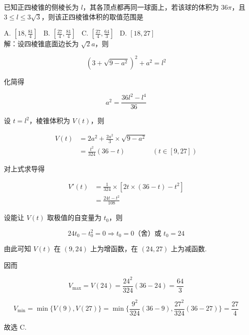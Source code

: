 \documentclass[UTF8]{ctexart}
\begin{document}
\thispagestyle{empty}
\pagestyle{empty}

\noindent 已知正四棱锥的侧棱长为 $l$，其各顶点都再同一球面上，若该球的体积为 $36 \pi$，且 $3 \le l \le 3 \sqrt 3$，则该正四棱锥体积的取值范围是

\noindent A. $[18,\frac{81}{4}]$ \,
B. $[\frac{27}{4},\frac{81}{4}]$ \,
C. $[\frac{27}{4},\frac{64}{3}]$ \,
D. $[18,27]$ \\

\noindent 解：设四棱锥底面边长为 $\sqrt 2a$，则

$$(3+\sqrt{9-a^2})^2+a^2=l^2$$

\noindent 化简得

$$a^2=\frac{36l^2-l^4}{36}$$

\noindent 设 $t=l^2$，棱锥体积为 $V(t)$，则

\begin{align*}
V(t) &= 2a^2+\frac{2a^2}{3} \times \sqrt{9-a^2} \\
&= \frac{t^2}{324}(36-t) \qquad  \qquad (t \in [9,27])
\end{align*}

\noindent 对上式求导得

\begin{align*}
V'(t) &= \frac{1}{324} \times [2t \times (36-t)-t^2] \\ 
&= \frac{24t-t^2}{108}
\end{align*}

\noindent 设能让 $V(t)$ 取极值的自变量为 $t_0$，则

$$24t_0-t_0^2=0 \Rightarrow t_0=0 \text{（舍）或 } t_0=24$$

\noindent 由此可知 $V(t)$ 在 $(9,24)$ 上为增函数，在 $(24,27)$ 上为减函数.

\noindent 因而

$$V_{\max}=V(24)=\frac{24^2}{324}(36-24)=\frac{64}{3}$$

$$V_{\min}=\min\{V(9),V(27)\}=\min\{\frac{9^2}{324}(36-9),\frac{27^2}{324}(36-27)\}=\frac{27}{4}$$

\noindent 故选 C.
\end{document}
